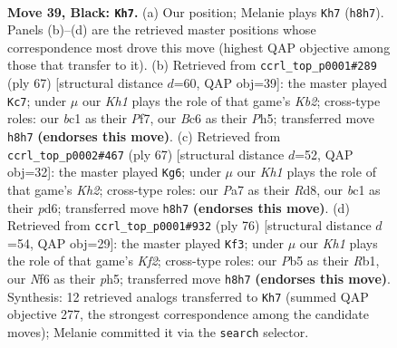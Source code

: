 \documentclass[11pt]{article}
\begin{document}
\clearpage

\begin{figure}[p]\centering
\begin{subfigure}{0.46\textwidth}\centering
\resizebox{\linewidth}{!}{%
\newchessgame
\chessboard[
  setfen={2r4k/p5p1/P1bb1n1p/1p3p2/1P3P2/1R2P1P1/7K/RNB5 b - - 8 39},
  showmover=false,
  pgfstyle=straightmove, color=movearrow, markmove={h8-h7}
]}
\caption{}
\end{subfigure}\hfill
\begin{subfigure}{0.46\textwidth}\centering
\resizebox{\linewidth}{!}{%
\newchessgame
\chessboard[
  setfen={3r4/1k2bp2/2b1p1p1/p1p4p/2N1PP1P/6P1/1PP5/1K2RB2 b - - 5 34},
  showmover=false,
  pgfstyle=straightmove, color=movearrow, markmove={b7-c7}
]}
\caption{}
\end{subfigure}
\\[4pt]
\begin{subfigure}{0.46\textwidth}\centering
\resizebox{\linewidth}{!}{%
\newchessgame
\chessboard[
  setfen={3r4/3b2pk/pp1P3p/2pB2p1/P5P1/1P1R3P/5P2/6K1 b - - 0 34},
  showmover=false,
  pgfstyle=straightmove, color=movearrow, markmove={h7-g6}
]}
\caption{}
\end{subfigure}\hfill
\begin{subfigure}{0.46\textwidth}\centering
\resizebox{\linewidth}{!}{%
\newchessgame
\chessboard[
  setfen={1br5/pp3rk1/6p1/5p1p/PB1P1P2/3BP3/5KPP/1R6 w - - 0 39},
  showmover=false,
  pgfstyle=straightmove, color=movearrow, markmove={f2-f3}
]}
\caption{}
\end{subfigure}
\caption{\textbf{Move 39, Black: \texttt{Kh7}.} (a) Our position; Melanie plays \texttt{Kh7} (\texttt{h8h7}). Panels (b)--(d) are the retrieved master positions whose correspondence most drove this move (highest QAP objective among those that transfer to it). (b) Retrieved from \texttt{ccrl\_top\_p0001\#289} (ply 67) [structural distance $d$=60, QAP obj=39]: the master played \texttt{Kc7}; under $\mu$ our \emph{Kh1} plays the role of that game's \emph{Kb2}; cross-type roles: our \emph{b}c1 as their \emph{P}f7, our \emph{B}c6 as their \emph{P}h5; transferred move \texttt{h8h7} \textbf{(endorses this move)}. (c) Retrieved from \texttt{ccrl\_top\_p0002\#467} (ply 67) [structural distance $d$=52, QAP obj=32]: the master played \texttt{Kg6}; under $\mu$ our \emph{Kh1} plays the role of that game's \emph{Kh2}; cross-type roles: our \emph{P}a7 as their \emph{R}d8, our \emph{b}c1 as their \emph{p}d6; transferred move \texttt{h8h7} \textbf{(endorses this move)}. (d) Retrieved from \texttt{ccrl\_top\_p0001\#932} (ply 76) [structural distance $d$=54, QAP obj=29]: the master played \texttt{Kf3}; under $\mu$ our \emph{Kh1} plays the role of that game's \emph{Kf2}; cross-type roles: our \emph{P}b5 as their \emph{R}b1, our \emph{N}f6 as their \emph{p}h5; transferred move \texttt{h8h7} \textbf{(endorses this move)}. Synthesis: 12 retrieved analogs transferred to \texttt{Kh7} (summed QAP objective 277, the strongest correspondence among the candidate moves); Melanie committed it via the \texttt{search} selector.}
\label{fig:thought-m77}
\end{figure}
\end{document}

